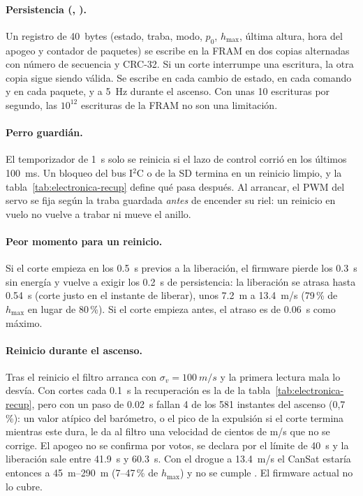 \paragraph{Persistencia (, ).} Un registro de \SI{40}{bytes} (estado,
traba, modo, $p_0$, $h_{\max}$, última altura, hora del apogeo y contador de paquetes) se
escribe en la FRAM en dos copias alternadas con número de secuencia y CRC-32. Si un corte
interrumpe una escritura, la otra copia sigue siendo válida. Se escribe en cada cambio de
estado, en cada comando y en cada paquete, y a \SI{5}{Hz} durante el ascenso. Con unas 10
escrituras por segundo, las $10^{12}$ escrituras de la FRAM no son una limitación.

\paragraph{Perro guardián.} El temporizador de \SI{1}{s} solo se reinicia si el lazo de
control corrió en los últimos \SI{100}{ms}. Un bloqueo del bus I$^2$C o de la SD termina en
un reinicio limpio, y la tabla~\ref{tab:electronica-recup} define qué pasa después. Al
arrancar, el PWM del servo se fija según la traba guardada \emph{antes} de encender su riel:
un reinicio en vuelo no vuelve a trabar ni mueve el anillo.

\paragraph{Peor momento para un reinicio.} Si el corte empieza en los \SI{0.5}{s} previos a
la liberación, el firmware pierde los \SI{0.3}{s} sin energía y vuelve a exigir los
\SI{0.2}{s} de persistencia: la liberación se atrasa hasta \SI{0.54}{s} (corte justo en el
instante de liberar), unos \SI{7.2}{m} a \SI{13.4}{m/s} (79\,\% de $h_{\max}$ en lugar de
80\,\%). Si el corte empieza antes, el atraso es de \SI{0.06}{s} como máximo.

\paragraph{Reinicio durante el ascenso.} Tras el reinicio el filtro arranca con
$\sigma_v=\SI{100}{m/s}$ y la primera lectura mala lo desvía. Con cortes cada \SI{0.1}{s}
la recuperación es la de la tabla~\ref{tab:electronica-recup}, pero con un paso de
\SI{0.02}{s} fallan 4 de los 581 instantes del ascenso (0,7\,\%): un valor atípico del
barómetro, o el pico de la expulsión si el corte termina mientras este dura, le da al filtro
una velocidad de cientos de \si{m/s} que no se corrige. El apogeo no se confirma por votos,
se declara por el límite de \SI{40}{s} y la liberación sale entre \SI{41.9}{s} y
\SI{60.3}{s}. Con el drogue a \SI{13.4}{m/s} el CanSat estaría entonces a
\SIrange{45}{290}{m} (7--47\,\% de $h_{\max}$) y no se cumple . El firmware actual no
lo cubre.

